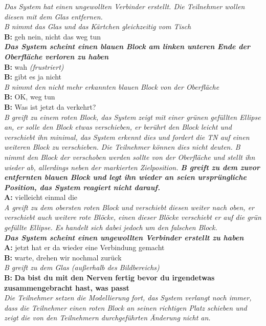 \begin{transkript}
\emph{Das System hat einen ungewollten Verbinder erstellt. Die Teilnehmer wollen diesen mit dem Glas entfernen.} \\
\emph{B nimmt das Glas und das Kärtchen gleichzeitig vom Tisch} \\
\textbf{B:} geh nein, nicht das weg tun \\
\emph{\textbf{Das System scheint einen blauen Block am linken unteren Ende der Oberfläche verloren zu haben}} \\
\textbf{B:} wah \emph{(frustriert)} \\
\textbf{B:} gibt es ja nicht \\
\emph{B nimmt den nicht mehr erkannten blauen Block von der Oberfläche} \\
\textbf{B:} OK, weg tun \\
\textbf{B:} Was ist jetzt da verkehrt? \\
\emph{B greift zu einem roten Block, das System zeigt mit einer grünen gefüllten Ellipse an, er solle den Block etwas verschieben, er berührt den Block leicht und verschiebt ihn minimal, das System erkennt dies und fordert die TN auf einen weiteren Block zu verschieben. Die Teilnehmer können dies nicht deuten. B nimmt den Block der verschoben werden sollte von der Oberfläche und stellt ihn wieder ab, allerdings neben der markierten Zielposition. \textbf{B greift zu dem zuvor entfernten blauen Block und legt ihn wieder an seien ursprüngliche Position, das System reagiert nicht darauf.}} \\
\textbf{A:} vielleicht einmal die \\
\emph{A greift zu dem obersten roten Block und verschiebt diesen weiter nach oben, er verschiebt auch weitere rote Blöcke, einen dieser Blöcke verschiebt er auf die grün gefüllte Ellipse. Es handelt sich dabei jedoch um den falschen Block.} \\
\emph{\textbf{Das System scheint einen ungewollten Verbinder erstellt zu haben}} \\
\textbf{A:} jetzt hat er da wieder eine Verbindung gemacht \\
\textbf{B:} warte, drehen wir nochmal zurück \\
\emph{B greift zu dem Glas (außerhalb des Bildbereichs)} \\
\textbf{B:} \textbf{Da bist du mit den Nerven fertig bevor du irgendetwas zusammengebracht hast, was passt} \\
\emph{Die Teilnehmer setzen die Modellierung fort, das System verlangt noch immer, dass die Teilnehmer einen roten Block an seinen richtigen Platz schieben und zeigt die von den Teilnehmern durchgeführten Änderung nicht an.} \\
\end{transkript}

